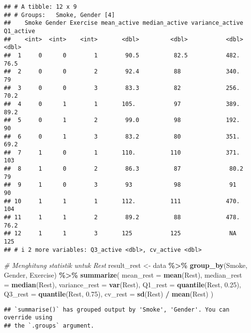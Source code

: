 \documentclass[
]{article}
\newenvironment{Shaded}{\begin{snugshade}}{\end{snugshade}}
\newcommand{\AttributeTok}[1]{\textcolor[rgb]{0.13,0.29,0.53}{#1}}
\newcommand{\CommentTok}[1]{\textcolor[rgb]{0.56,0.35,0.01}{\textit{#1}}}
\newcommand{\FloatTok}[1]{\textcolor[rgb]{0.00,0.00,0.81}{#1}}
\newcommand{\FunctionTok}[1]{\textcolor[rgb]{0.13,0.29,0.53}{\textbf{#1}}}
\newcommand{\NormalTok}[1]{#1}
\newcommand{\OtherTok}[1]{\textcolor[rgb]{0.56,0.35,0.01}{#1}}
\newcommand{\SpecialCharTok}[1]{\textcolor[rgb]{0.81,0.36,0.00}{\textbf{#1}}}
\begin{document}
\begin{verbatim}
## # A tibble: 12 x 9
## # Groups:   Smoke, Gender [4]
##    Smoke Gender Exercise mean_active median_active variance_active Q1_active
##    <int>  <int>    <int>       <dbl>         <dbl>           <dbl>     <dbl>
##  1     0      0        1        90.5          82.5           482.       76.5
##  2     0      0        2        92.4          88             340.       79  
##  3     0      0        3        83.3          82             256.       70.2
##  4     0      1        1       105.           97             389.       89.2
##  5     0      1        2        99.0          98             192.       90  
##  6     0      1        3        83.2          80             351.       69.2
##  7     1      0        1       110.          110             371.      103  
##  8     1      0        2        86.3          87              80.2      79  
##  9     1      0        3        93            98              91        90  
## 10     1      1        1       112.          111             470.      104  
## 11     1      1        2        89.2          88             478.       76.2
## 12     1      1        3       125           125              NA       125  
## # i 2 more variables: Q3_active <dbl>, cv_active <dbl>
\end{verbatim}

\begin{Shaded}
\begin{Highlighting}[]
\CommentTok{\# Menghitung statistik untuk Rest }
\NormalTok{result\_rest }\OtherTok{\textless{}{-}}\NormalTok{ data }\SpecialCharTok{\%\textgreater{}\%}
  \FunctionTok{group\_by}\NormalTok{(Smoke, Gender, Exercise) }\SpecialCharTok{\%\textgreater{}\%}
  \FunctionTok{summarize}\NormalTok{(}
    \AttributeTok{mean\_rest =} \FunctionTok{mean}\NormalTok{(Rest),}
    \AttributeTok{median\_rest =} \FunctionTok{median}\NormalTok{(Rest),}
    \AttributeTok{variance\_rest =} \FunctionTok{var}\NormalTok{(Rest),}
    \AttributeTok{Q1\_rest =} \FunctionTok{quantile}\NormalTok{(Rest, }\FloatTok{0.25}\NormalTok{),}
    \AttributeTok{Q3\_rest =} \FunctionTok{quantile}\NormalTok{(Rest, }\FloatTok{0.75}\NormalTok{),}
    \AttributeTok{cv\_rest =} \FunctionTok{sd}\NormalTok{(Rest) }\SpecialCharTok{/} \FunctionTok{mean}\NormalTok{(Rest)}
\NormalTok{  )}
\end{Highlighting}
\end{Shaded}

\begin{verbatim}
## `summarise()` has grouped output by 'Smoke', 'Gender'. You can override using
## the `.groups` argument.
\end{verbatim}
\end{document}
